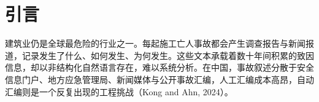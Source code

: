 \documentclass[11pt]{article}
\begin{document}
\section{{\cjkfont 引\allowbreak 言}}
{\cjkfont 建\allowbreak 筑\allowbreak 业\allowbreak 仍\allowbreak 是\allowbreak 全\allowbreak 球\allowbreak 最\allowbreak 危\allowbreak 险\allowbreak 的\allowbreak 行\allowbreak 业\allowbreak 之\allowbreak 一\allowbreak 。\allowbreak 每\allowbreak 起\allowbreak 施\allowbreak 工\allowbreak 亡\allowbreak 人\allowbreak 事\allowbreak 故\allowbreak 都\allowbreak 会\allowbreak 产\allowbreak 生\allowbreak 调\allowbreak 查\allowbreak 报\allowbreak 告\allowbreak 与\allowbreak 新\allowbreak 闻\allowbreak 报\allowbreak 道\allowbreak ，\allowbreak 记\allowbreak 录\allowbreak 发\allowbreak 生\allowbreak 了\allowbreak 什\allowbreak 么\allowbreak 、\allowbreak 如\allowbreak 何\allowbreak 发\allowbreak 生\allowbreak 、\allowbreak 为\allowbreak 何\allowbreak 发\allowbreak 生\allowbreak 。\allowbreak 这\allowbreak 些\allowbreak 文\allowbreak 本\allowbreak 承\allowbreak 载\allowbreak 着\allowbreak 数\allowbreak 十\allowbreak 年\allowbreak 间\allowbreak 积\allowbreak 累\allowbreak 的\allowbreak 致\allowbreak 因\allowbreak 信\allowbreak 息\allowbreak ，\allowbreak 却\allowbreak 以\allowbreak 非\allowbreak 结\allowbreak 构\allowbreak 化\allowbreak 自\allowbreak 然\allowbreak 语\allowbreak 言\allowbreak 存\allowbreak 在\allowbreak ，\allowbreak 难\allowbreak 以\allowbreak 系\allowbreak 统\allowbreak 分\allowbreak 析\allowbreak 。\allowbreak 在\allowbreak 中\allowbreak 国\allowbreak ，\allowbreak 事\allowbreak 故\allowbreak 叙\allowbreak 述\allowbreak 分\allowbreak 散\allowbreak 于\allowbreak 安\allowbreak 全\allowbreak 信\allowbreak 息\allowbreak 门\allowbreak 户\allowbreak 、\allowbreak 地\allowbreak 方\allowbreak 应\allowbreak 急\allowbreak 管\allowbreak 理\allowbreak 局\allowbreak 、\allowbreak 新\allowbreak 闻\allowbreak 媒\allowbreak 体\allowbreak 与\allowbreak 公\allowbreak 开\allowbreak 事\allowbreak 故\allowbreak 汇\allowbreak 编\allowbreak ，\allowbreak 人\allowbreak 工\allowbreak 汇\allowbreak 编\allowbreak 成\allowbreak 本\allowbreak 高\allowbreak 昂\allowbreak ，\allowbreak 自\allowbreak 动\allowbreak 汇\allowbreak 编\allowbreak 则\allowbreak 是\allowbreak 一\allowbreak 个\allowbreak 反\allowbreak 复\allowbreak 出\allowbreak 现\allowbreak 的\allowbreak 工\allowbreak 程\allowbreak 挑\allowbreak 战\allowbreak （}Kong and Ahn, 2024{\cjkfont ）\allowbreak 。}
\end{document}
